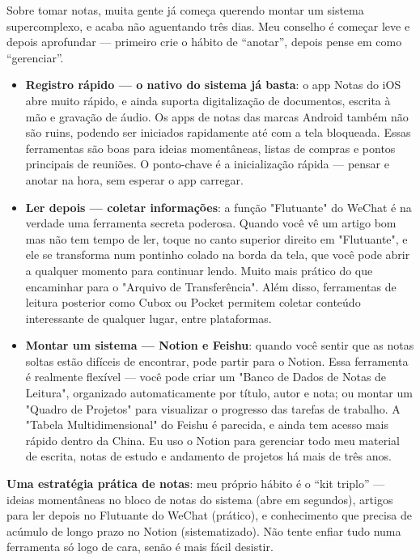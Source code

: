 
Sobre tomar notas, muita gente já começa querendo montar um sistema supercomplexo, e acaba não aguentando três dias. Meu conselho é começar leve e depois aprofundar — primeiro crie o hábito de “anotar”, depois pense em como “gerenciar”.

\begin{itemize}
  \item \textbf{Registro rápido — o nativo do sistema já basta}: o app Notas do iOS abre muito rápido, e ainda suporta digitalização de documentos, escrita à mão e gravação de áudio. Os apps de notas das marcas Android também não são ruins, podendo ser iniciados rapidamente até com a tela bloqueada. Essas ferramentas são boas para ideias momentâneas, listas de compras e pontos principais de reuniões. O ponto-chave é a inicialização rápida — pensar e anotar na hora, sem esperar o app carregar.
  \item \textbf{Ler depois — coletar informações}: a função "Flutuante" do WeChat é na verdade uma ferramenta secreta poderosa. Quando você vê um artigo bom mas não tem tempo de ler, toque no canto superior direito em "Flutuante", e ele se transforma num pontinho colado na borda da tela, que você pode abrir a qualquer momento para continuar lendo. Muito mais prático do que encaminhar para o "Arquivo de Transferência". Além disso, ferramentas de leitura posterior como Cubox ou Pocket permitem coletar conteúdo interessante de qualquer lugar, entre plataformas.
  \item \textbf{Montar um sistema — Notion e Feishu}: quando você sentir que as notas soltas estão difíceis de encontrar, pode partir para o Notion. Essa ferramenta é realmente flexível — você pode criar um "Banco de Dados de Notas de Leitura", organizado automaticamente por título, autor e nota; ou montar um "Quadro de Projetos" para visualizar o progresso das tarefas de trabalho. A "Tabela Multidimensional" do Feishu é parecida, e ainda tem acesso mais rápido dentro da China. Eu uso o Notion para gerenciar todo meu material de escrita, notas de estudo e andamento de projetos há mais de três anos.
\end{itemize}

\textbf{Uma estratégia prática de notas}: meu próprio hábito é o “kit triplo” — ideias momentâneas no bloco de notas do sistema (abre em segundos), artigos para ler depois no Flutuante do WeChat (prático), e conhecimento que precisa de acúmulo de longo prazo no Notion (sistematizado). Não tente enfiar tudo numa ferramenta só logo de cara, senão é mais fácil desistir.

